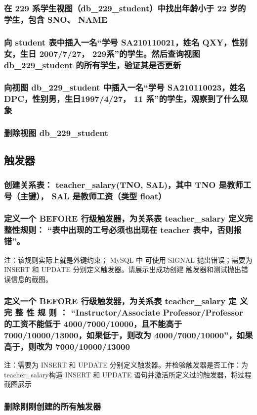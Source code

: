 \documentclass{ctexart}
\begin{document}
\subsubsection{在 229 系学生视图（db\_229\_student）中找出年龄小于 22 岁的学生，包含 SNO、 NAME}
\subsubsection{向 student 表中插入一名“学号 SA210110021，姓名 QXY，性别女，生日 2007/7/27， 229系”的学生。然后查询视图 db\_229\_student 的所有学生，验证其是否更新}
\subsubsection{向视图 db\_229\_student 中插入一名“学号 SA210110023，姓名 DPC，性别男，生日1997/4/27， 11 系”的学生，观察到了什么现象}
\subsubsection{删除视图 db\_229\_student}
\subsection{触发器}
\subsubsection{创建关系表： teacher\_salary(TNO, SAL)，其中 TNO 是教师工号（主键）， SAL 是教师工资（类型 float）}
\subsubsection{定义一个 BEFORE 行级触发器，为关系表 teacher\_salary 定义完整性规则： “表中出现的工号必须也出现在 teacher 表中，否则报错”。}
注：该规则实际上就是外键约束； MySQL 中
可使用 SIGNAL 抛出错误；需要为 INSERT 和 UPDATE 分别定义触发器。请展示出成功创建
触发器和测试抛出错误信息的截图。
\subsubsection{定义一个 BEFORE 行级触发器，为关系表 teacher\_salary 定 义 完 整 性 规 则 ：
“Instructor/Associate Professor/Professor 的工资不能低于 4000/7000/10000，且不能高于
7000/10000/13000，如果低于，则改为 4000/7000/10000”，如果高于，则改为 7000/10000/13000}
注：需要为 INSERT 和 UPDATE 分别定义触发器。并检验触发器是否工作：为 teacher\_salary构造 INSERT 和 UPDATE 语句并激活所定义过的触发器，将过程截图展示
\subsubsection{删除刚刚创建的所有触发器}
\end{document}

